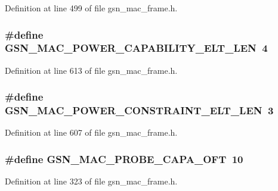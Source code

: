 Definition at line 499 of file gsn\_\-mac\_\-frame.h.

\hypertarget{a00523_aad5e9a40464bfb319dee31b2584df6f0}{
\subsubsection[{GSN\_\-MAC\_\-POWER\_\-CAPABILITY\_\-ELT\_\-LEN}]{\setlength{\rightskip}{0pt plus 5cm}\#define GSN\_\-MAC\_\-POWER\_\-CAPABILITY\_\-ELT\_\-LEN~4}}
\label{a00523_aad5e9a40464bfb319dee31b2584df6f0}


Definition at line 613 of file gsn\_\-mac\_\-frame.h.

\hypertarget{a00523_a80b810016a25731cabb7ca3d35bb96cf}{
\subsubsection[{GSN\_\-MAC\_\-POWER\_\-CONSTRAINT\_\-ELT\_\-LEN}]{\setlength{\rightskip}{0pt plus 5cm}\#define GSN\_\-MAC\_\-POWER\_\-CONSTRAINT\_\-ELT\_\-LEN~3}}
\label{a00523_a80b810016a25731cabb7ca3d35bb96cf}


Definition at line 607 of file gsn\_\-mac\_\-frame.h.

\hypertarget{a00523_a54fca6ea76a9286a631437d6d49ae1ad}{
\subsubsection[{GSN\_\-MAC\_\-PROBE\_\-CAPA\_\-OFT}]{\setlength{\rightskip}{0pt plus 5cm}\#define GSN\_\-MAC\_\-PROBE\_\-CAPA\_\-OFT~10}}
\label{a00523_a54fca6ea76a9286a631437d6d49ae1ad}


Definition at line 323 of file gsn\_\-mac\_\-frame.h.

